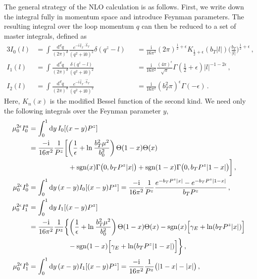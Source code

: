 \documentclass[11pt,a4paper]{article}
\newcommand{\df}{\mathrm{d}}
\newcommand{\img}{\mathrm{i}}
\newcommand{\eps}{\epsilon}
\newcommand{\nn}{\nonumber}
\newcommand{\Lb}[1]{\ln^{#1}\frac{b_T^2 \mu^2}{b_0^2}}
\newcommand{\bt}{\vec b_T}
\newcommand{\qt}{\vec q_T}
\newcommand{\sgn}[1]{\mathrm{sgn}(#1)}
\begin{document}
The general strategy of the NLO calculation is as follows.
First, we write down the integral fully in momentum space and introduce Feynman parameters.
The resulting integral over the loop momentum $q$ can then be reduced
to a set of master integrals, defined as
\begin{alignat}{3}
 \label{eq:I0}
 I_0(l) &= \int \frac{\df^d q}{(2\pi)^d} \frac{e^{-\img \qt \cdot \bt}}{(q^2 + \img0)^2} \delta(q^z - l)
 &&= \frac{\img}{16 \pi^3} (2\pi)^{\frac{1}{2}+\eps} K_{\frac{1}{2}+\eps}(b_T |l|) \biggl(\!\frac{b_T}{|l|}\!\biggr)^{\frac{1}{2}+\eps}
\,,\\
 \label{eq:I1}
 I_1(l) &= \int \frac{\df^d q}{(2\pi)^d} \frac{\delta(q^z - l)}{(q^2 + \img0)^2}
 &&= \frac{\img}{16 \pi^2} \frac{(4\pi)^\eps}{\sqrt{\pi}} \Gamma\left(\frac{1}{2}+\eps\right) |l|^{-1-2\eps}
\,,\\
 \label{eq:I2}
 I_2(l) &= \int \frac{\df^d q}{(2\pi)^d} \frac{e^{-\img \qt \cdot \bt}}{(q^2 + \img0)^2}
 &&= \frac{\img}{16 \pi^2} (b_T^2 \pi)^\eps \Gamma(-\eps)
\,.\end{alignat}
Here, $K_n(x)$ is the modified Bessel function of the second kind.
We need only the following integrals over the Feynman parameter $y$,
\allowdisplaybreaks
\begin{align}
 \label{eq:I0a}
 \mu_0^{2\eps} I_0^a &= \int_0^1 \df y \, I_0[(x-y) P^z]
 \nn\\*&
 = \frac{-\img}{16\pi^2} \frac{1}{P^z} \biggl[
   \left(\frac{1}{\eps} + \Lb{}\right)\Theta(1-x)\Theta(x)
  \nn\\*&\hspace{2cm}
  + \sgn{x} \Gamma\bigl(0, b_T P^z |x|\bigr) + \sgn{1-x} \Gamma\bigl(0, b_T P^z |1-x|\bigr) \biggr]
\,,\\
 \label{eq:I0b}
 \mu_0^{2\eps} I_0^b &= \int_0^1 \df y \, (x-y) I_0[(x-y) P^z]
 = \frac{-\img}{16 \pi^2} \frac{1}{P^z} \frac{e^{-b_T P^z |x|} - e^{-b_T P^z |1-x|}}{b_T P^z}
\,,\\
 \label{eq:I1a}
 \mu_0^{2\eps} I_1^a &= \int_0^1 \df y \, I_1[(x-y) P^z]
 \nn\\*&
 = \frac{-\img}{16\pi^2} \frac{1}{P^z} \biggl\{
     \left( \frac{1}{\eps} + \Lb{} \right)\Theta(1-x)\Theta(x)
    - \sgn{x} \Bigl[\gamma_E + \ln(b_T P^z |x|)\Bigr]
    \nn\\*&\hspace{2.cm}
    - \sgn{1-x} \Bigl[\gamma_E + \ln(b_T P^z |1-x|)\Bigr] \biggr\}
\,,\\
 \label{eq:I1b}
 \mu_0^{2\eps} I_1^b &= \int_0^1 \df y \, (x-y) I_1[(x-y) P^z]
 = \frac{-\img}{16 \pi^2} \frac{1}{P^z} \bigl( |1-x|-|x| \bigr)
\,,\end{align}
\end{document}
